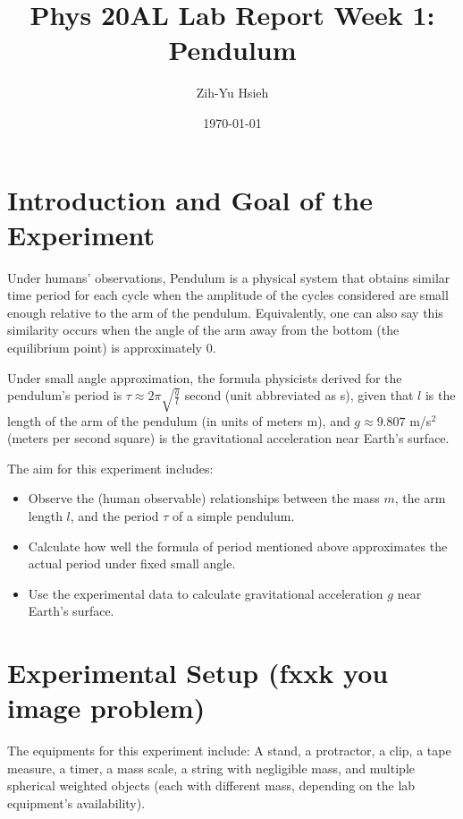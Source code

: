 \documentclass{article}
\title{Phys 20AL Lab Report Week 1: Pendulum}
\author{Zih-Yu Hsieh}
\date{\today}
\begin{document}
\maketitle

\tableofcontents

\hfil

\section{Introduction and Goal of the Experiment}
Under humans' observations, Pendulum is a physical system that obtains similar time period for each cycle when the amplitude of the cycles considered are small enough relative to the arm of the pendulum. Equivalently, one can also say this similarity occurs when the angle of the arm away from the bottom (the equilibrium point) is approximately $0$.

Under small angle approximation, the formula physicists derived for the pendulum's period is $\tau\approx 2\pi\sqrt{\frac{g}{l}}$ second (unit abbreviated as s), given that $l$ is the length of the arm of the pendulum (in units of meters m), and $g \approx 9.807$ m/s$^2$ (meters per second square) is the gravitational acceleration near Earth's surface.

The aim for this experiment includes:
\begin{itemize}
    \item Observe the (human observable) relationships between the mass $m$, the arm length $l$, and the period $\tau$ of a simple pendulum.
    \item Calculate how well the formula of period mentioned above approximates the actual period under fixed small angle.
    \item Use the experimental data to calculate gravitational acceleration $g$ near Earth's surface.
\end{itemize}

\pagebreak

\section{Experimental Setup (fxxk you image problem)}
The equipments for this experiment include: A stand, a protractor, a clip, a tape measure, a timer, a mass scale, a string with negligible mass, and multiple spherical weighted objects (each with different mass, depending on the lab equipment's availability).
\end{document}
